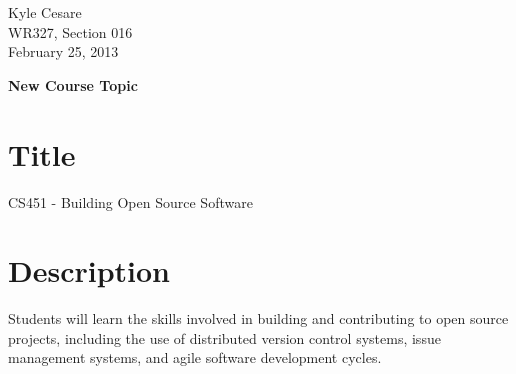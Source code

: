 \documentclass[12pt,letterpaper]{article}
\begin{document}
\begin{flushleft}
  Kyle Cesare \\
  WR327, Section 016\\
  February 25, 2013
\end{flushleft}

\thispagestyle{empty}

\begin{center}
  \Large \textbf{New Course Topic}
\end{center}

\section*{Title}
CS451 - Building Open Source Software

\section*{Description}
Students will learn the skills involved in building and contributing to open
source projects, including the use of distributed version control systems, issue
management systems, and agile software development cycles.
\end{document}
